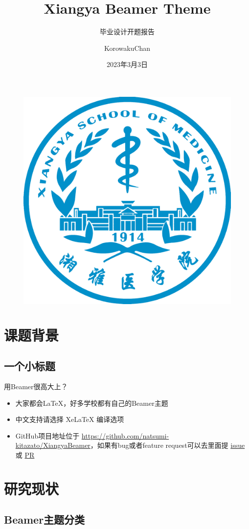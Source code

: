 \documentclass{beamer}
\author{KorowakuChan}
\title{Xiangya Beamer Theme}
\subtitle{毕业设计开题报告}
\institute[临床医学5年制]{中南大学湘雅医学院}
\date{2023年3月3日}
\begin{document}
\begin{frame}
    \titlepage
    \begin{figure}[htpb]
        \begin{center}
            \includegraphics[width=0.2\linewidth]{pic/xiangya2048.png}
        \end{center}
    \end{figure}
\end{frame}

\begin{frame}
    \tableofcontents[sectionstyle=show,subsectionstyle=show/shaded/hide,subsubsectionstyle=show/shaded/hide]
\end{frame}


\section{课题背景}
\subsection{一个小标题}
\begin{frame}{用Beamer很高大上？}
    \begin{itemize}[<+->] %
        \item 大家都会\LaTeX{}，好多学校都有自己的Beamer主题
        \item 中文支持请选择 Xe\LaTeX{} 编译选项
        \item GitHub项目地址位于 \url{https://github.com/natsumi-kitazato/XiangyaBeamer}，如果有bug或者feature request可以去里面提 \href{https://github.com/natsumi-kitazato/XiangyaBeamer/issues}{issue} 或 \href{https://github.com/natsumi-kitazato/XiangyaBeamer/pulls}{PR}
    \end{itemize}
\end{frame}


\section{研究现状}

\subsection{Beamer主题分类}
\end{document}

